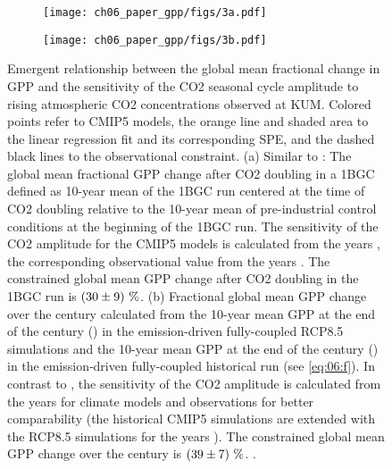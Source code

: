\begin{figure}[t]
  \centering
  \begin{subfigure}[b]{0.37\columnwidth}
    \texttt{[image: ch06\_paper\_gpp/figs/3a.pdf]}
    \caption{}
    \label{fig:06:step1:a}
  \end{subfigure}
  \begin{subfigure}[b]{0.37\columnwidth}
    \texttt{[image: ch06\_paper\_gpp/figs/3b.pdf]}
    \caption{}
    \label{fig:06:step1:b}
  \end{subfigure}
  \begin{subfigure}[b]{0.24\columnwidth}
  \end{subfigure}
  \caption[
    Emergent relationship between the global mean fractional change in
    \acf{GPP} and the sensitivity of the \acs{CO2} seasonal cycle amplitude to
    rising atmospheric \acs{CO2} concentrations observed at \acl{KUM}.
  ]{
    Emergent relationship between the global mean fractional change in
    \acf{GPP} and the sensitivity of the \acs{CO2} seasonal cycle amplitude to
    rising atmospheric \acs{CO2} concentrations observed at \acf{KUM}. Colored
    points refer to \acs{CMIP}5 models, the orange line and shaded area to the
    linear regression fit and its corresponding \acl{SPE}, and the dashed black
    lines to the observational constraint. (a) Similar to
    \textcite{Wenzel2016}: The global mean fractional \acs{GPP} change after
    \acs{CO2} doubling in a \acf{1BGC} defined as 10-year mean of the
    \acs{1BGC} run centered at the time of \acs{CO2} doubling relative to the
    10-year mean of pre-industrial control conditions at the beginning of the
    \acs{1BGC} run. The sensitivity of the \acs{CO2} amplitude for the
    \acs{CMIP}5 models is calculated from the years , the
    corresponding observational value from the years . The
    constrained global mean \acs{GPP} change after \acs{CO2} doubling in the
    \acs{1BGC} run is $\pmrangeunit{30}{9}{\%}$. (b) Fractional global mean
    \acs{GPP} change over the  century calculated from the 10-year mean
    \acs{GPP} at the end of the  century () in the
    emission-driven fully-coupled \acs{RCP}8.5 simulations and the 10-year mean
    \acs{GPP} at the end of the  century () in the
    emission‐driven fully-coupled historical run (see \cref{eq:06:f}). In
    contrast to \textcite{Wenzel2016}, the sensitivity of the \acs{CO2}
    amplitude is calculated from the years  for climate
    models and observations for better comparability (the historical
    \acs{CMIP}5 simulations are extended with the \acs{RCP}8.5 simulations for
    the years ). The constrained global mean \acs{GPP} change
    over the  century is $\pmrangeunit{39}{7}{\%}$.
    .
  }
  \label{fig:06:step1}
\end{figure}

